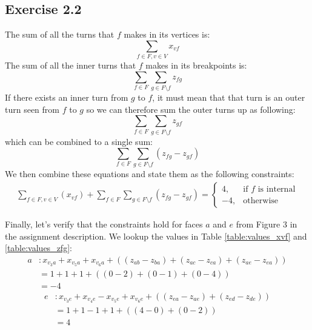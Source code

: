 \documentclass[12pt]{article}
\begin{document}
\subsection*{Exercise 2.2}

  The sum of all the turns that $f$ makes in its vertices is:
  $$\sum_{f \in F, v \in V}{x_{vf}}$$
  The sum of all the inner turns that $f$ makes in its breakpoints is:
  $$\sum_{f \in F}\sum_{g \in F \setminus f}z_{fg}$$
  If there exists an inner turn from $g$ to $f$, it must mean that that turn is an outer turn seen from $f$ to $g$ so we can therefore sum the outer turns up as following:
  $$\sum_{f \in F}\sum_{g \in F \setminus f}z_{gf}$$
  which can be combined to a single sum:
  $$\sum_{f \in F}\sum_{g \in F \setminus f}(z_{fg} - z_{gf})$$
  We then combine these equations and state them as the following constraints:
  \begin{align*}
      \sum_{f \in F, v \in V}(x_{vf}) + \sum_{f \in F}\sum_{g \in F \setminus f}(z_{fg} - z_{gf}) = \begin{cases}
                                                                                       4, & \text{if } f \text{ is internal}\\
                                                                                      -4, & \text{otherwise}
                                                                                   \end{cases}
  \end{align*}

  Finally, let's verify that the constraints hold for faces $a$ and $e$ from Figure 3 in the assignment description. We lookup the values in Table \ref{table:values_xvf} and \ref{table:values_zfg}:
  \begin{align*}
    a &: x_{v_{3}a} + x_{v_{5}a} + x_{v_{6}a} + ((z_{ab} - z_{ba}) + (z_{ac} - z_{ca}) + (z_{ae} - z_{ea}))\\
      &= 1 + 1 + 1 + ((0 - 2) + (0 - 1) + (0 - 4)) \\
      &= -4
  \end{align*}
  \begin{align*}
    e &: x_{v_{3}e} + x_{v_{4}e} - x_{v_{5}e} + x_{v_{6}e} + ((z_{ea} - z_{ae}) + (z_{ed} - z_{de}))\\
      &= 1 + 1 -1 + 1 + ((4 - 0) + (0 - 2)) \\
      &= 4
  \end{align*}
\end{document}
